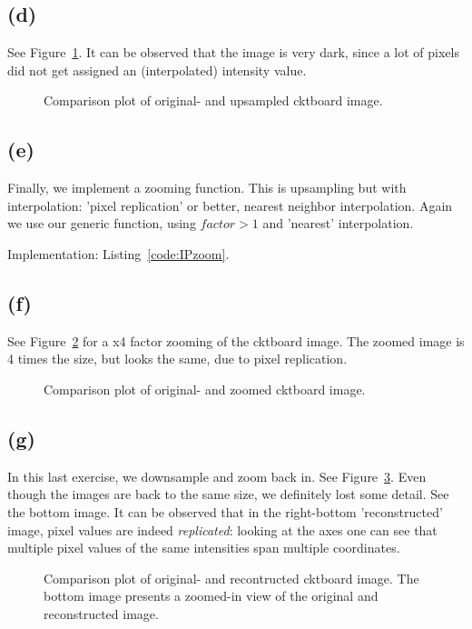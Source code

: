 \documentclass{article}
\begin{document}
\subsection*{(d)} See Figure~\ref{fig:upsampling}. It can be observed that the image is very dark, since a lot of pixels did not get assigned an (interpolated) intensity value.

\begin{figure}[ht]
    \centering
    
    \caption{Comparison plot of original- and upsampled cktboard image.}
    \label{fig:upsampling}
\end{figure}

\subsection*{(e)} Finally, we implement a zooming function. This is upsampling but with interpolation: 'pixel replication' or better, nearest neighbor interpolation. Again we use our generic function, using $factor > 1$ and 'nearest' interpolation.

 Implementation: Listing~\ref{code:IPzoom}.

\subsection*{(f)} See Figure~\ref{fig:zoom} for a x4 factor zooming of the cktboard image. The zoomed image is 4 times the size, but looks the same, due to pixel replication.
\begin{figure}[ht]
    \centering
    
    \caption{Comparison plot of original- and zoomed cktboard image.}
    \label{fig:zoom}
\end{figure}

\subsection*{(g)} In this last exercise, we downsample and zoom back in. See Figure~\ref{fig:reconstruction}. Even though the images are back to the same size, we definitely lost some detail. See the bottom image. It can be observed that in the right-bottom 'reconstructed' image, pixel values are indeed \textit{replicated}: looking at the axes one can see that multiple pixel values of the same intensities span multiple coordinates.
\begin{figure}[ht]
    \centering
    
    
    \caption{Comparison plot of original- and recontructed cktboard image. The bottom image presents a zoomed-in view of the original and reconstructed image.}
    \label{fig:reconstruction}
\end{figure}
\end{document}
